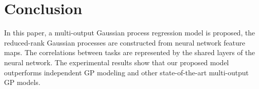 \section{Conclusion}\label{sec:conclusion}

In this paper, a multi-output Gaussian process regression model is proposed, the reduced-rank Gaussian processes are constructed from neural network feature maps. The correlations between tasks are represented by the shared layers of the neural network. The experimental results show that our proposed model outperforms independent GP modeling and other state-of-the-art multi-output GP models.

